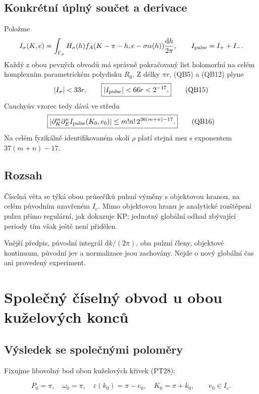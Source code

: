 \documentclass[11pt,a4paper]{article}
\theoremstyle{remark}\newtheorem{remark}[theorem]{Poznámka}
\numberwithin{equation}{section}
\begin{document}
\hypertarget{konkruxe9tnuxed-uxfaplnuxfd-souux10det-a-derivace}{%
\subsection{Konkrétní úplný součet a
derivace}\label{konkruxe9tnuxed-uxfaplnuxfd-souux10det-a-derivace}}

Položme \[
I_\sigma(K,e)=\int_{\Gamma_\sigma}
H_\sigma(h)f_A(K-\pi-h,e-\sigma\alpha(h))
\frac{\mathrm dh}{2\pi},\qquad
I_{\rm pulse}=I_++I_-.
\] Každý z obou pevných obvodů má správně pokračovaný list holomorfní na
celém komplexním parametrickém polydisku \(R_0\). Z délky \(\pi r\),
(QB5) a (QB12) plyne \[
|I_\sigma|<33r,\qquad
\boxed{|I_{\rm pulse}|<66r<2^{-17}.}
\tag{QB15}
\] Cauchyův vzorec tedy dává ve středu \[
\boxed{
|\partial_K^m\partial_E^n I_{\rm pulse}(K_0,e_0)|
\le m!n!\,2^{36(m+n)-17}.
}
\tag{QB16}
\] Na celém fyzikálně identifikovaném okolí \(\rho\) platí stejná mez s
exponentem \(37(m+n)-17\).

\hypertarget{rozsah}{%
\subsection{Rozsah}\label{rozsah}}

Číselná věta se týká obou průsečíků pulzní výměny s objektovou hranou,
na celém původním uzavřeném \(I_e\). Mimo objektovou hranu je analytické
rozštěpení pulzu přímo regulární, jak dokazuje KP; jednotný globální
odhad zbývající periody tím však ještě není přidělen.

Vnější předpis, původní integrál \(\mathrm dk/(2\pi)\), oba pulzní
členy, objektové kontinuum, původní jev a normalizace jsou zachovány.
Nejde o nový globální čas ani provedený experiment.

\section{Společný číselný obvod u obou kuželových konců}
\hypertarget{vuxfdsledek-se-spoleux10dnuxfdmi-polomux11bry}{%
\subsection{Výsledek se společnými
poloměry}\label{vuxfdsledek-se-spoleux10dnuxfdmi-polomux11bry}}

Fixujme libovolný bod obou kuželových křivek (PT28):

\[
P_0=\pi,\quad \omega_0=\pi,\quad
\varepsilon(k_0)=\pi-e_0,\quad K_0=\pi+k_0,
\qquad e_0\in I_e.
\tag{QC1}
\]
\end{document}
